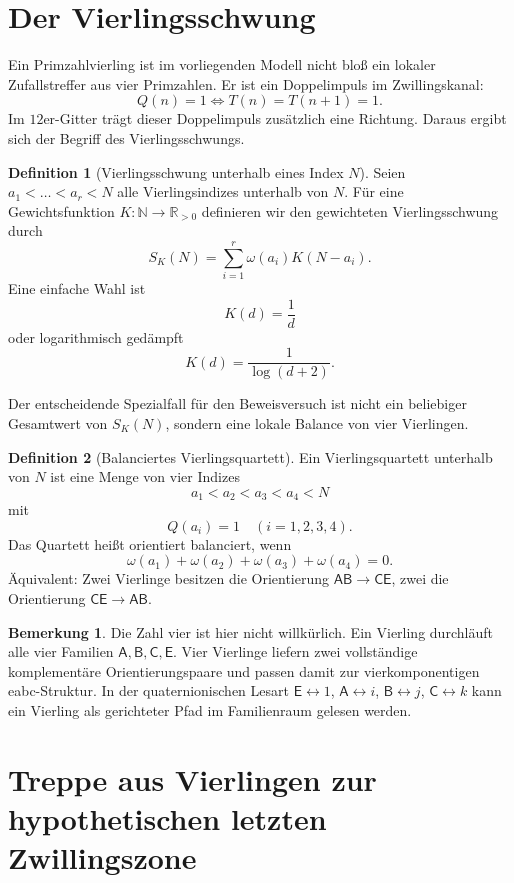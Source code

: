 \documentclass[11pt,a4paper]{article}
\theoremstyle{definition}
\newtheorem{definition}{Definition}
\newtheorem{remark}{Bemerkung}
\newcommand{\N}{\mathbb{N}}
\newcommand{\E}{\mathsf{E}}
\newcommand{\A}{\mathsf{A}}
\newcommand{\B}{\mathsf{B}}
\newcommand{\C}{\mathsf{C}}
\newcommand{\CE}{\mathsf{CE}}
\newcommand{\AB}{\mathsf{AB}}
\begin{document}
\section{Der Vierlingsschwung}

Ein Primzahlvierling ist im vorliegenden Modell nicht bloß ein lokaler Zufallstreffer aus vier Primzahlen. Er ist ein Doppelimpuls im Zwillingskanal:
\[
Q(n)=1 \iff T(n)=T(n+1)=1.
\]
Im $12$er-Gitter trägt dieser Doppelimpuls zusätzlich eine Richtung. Daraus ergibt sich der Begriff des Vierlingsschwungs.

\begin{definition}[Vierlingsschwung unterhalb eines Index $N$]
Seien $a_1<\dots<a_r<N$ alle Vierlingsindizes unterhalb von $N$. Für eine Gewichtsfunktion $K:\N\to\mathbb{R}_{>0}$ definieren wir den gewichteten Vierlingsschwung durch
\[
S_K(N)=\sum_{i=1}^r \omega(a_i)K(N-a_i).
\]
Eine einfache Wahl ist
\[
K(d)=\frac1d
\]
oder logarithmisch gedämpft
\[
K(d)=\frac{1}{\log(d+2)}.
\]
\end{definition}

Der entscheidende Spezialfall für den Beweisversuch ist nicht ein beliebiger Gesamtwert von $S_K(N)$, sondern eine lokale Balance von vier Vierlingen.

\begin{definition}[Balanciertes Vierlingsquartett]
Ein Vierlingsquartett unterhalb von $N$ ist eine Menge von vier Indizes
\[
a_1<a_2<a_3<a_4<N
\]
mit
\[
Q(a_i)=1 \quad (i=1,2,3,4).
\]
Das Quartett heißt orientiert balanciert, wenn
\[
\omega(a_1)+\omega(a_2)+\omega(a_3)+\omega(a_4)=0.
\]
Äquivalent: Zwei Vierlinge besitzen die Orientierung $\AB\to\CE$, zwei die Orientierung $\CE\to\AB$.
\end{definition}

\begin{remark}
Die Zahl vier ist hier nicht willkürlich. Ein Vierling durchläuft alle vier Familien $\A,\B,\C,\E$. Vier Vierlinge liefern zwei vollständige komplementäre Orientierungspaare und passen damit zur vierkomponentigen eabc-Struktur. In der quaternionischen Lesart $\E\leftrightarrow 1$, $\A\leftrightarrow i$, $\B\leftrightarrow j$, $\C\leftrightarrow k$ kann ein Vierling als gerichteter Pfad im Familienraum gelesen werden.
\end{remark}

\section{Treppe aus Vierlingen zur hypothetischen letzten Zwillingszone}
\end{document}
